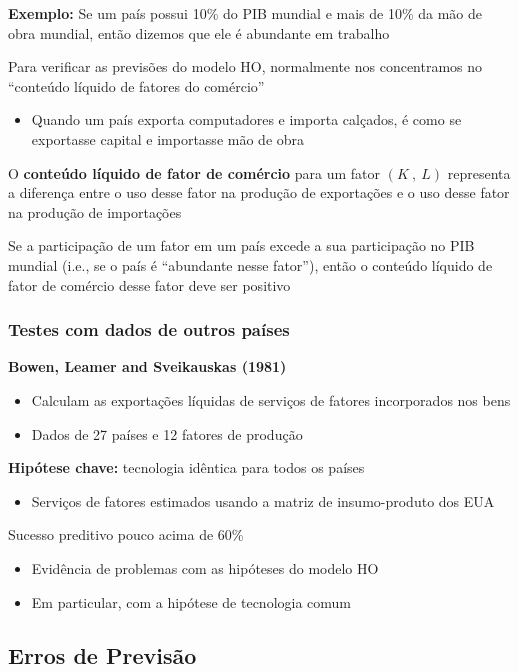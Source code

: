 \documentclass[a4paper,12pt]{article}[abntex2]
\begin{document}
\textbf{Exemplo:} Se um país possui 10\% do PIB mundial e mais de 10\% da mão de obra mundial, então dizemos que ele é abundante em trabalho

Para verificar as previsões do modelo HO, normalmente nos concentramos no “conteúdo líquido de fatores do comércio”\begin{itemize}
    \item Quando um país exporta computadores e importa calçados, é como se exportasse capital e importasse mão de obra
\end{itemize}

O \textbf{conteúdo líquido de fator de comércio} para um fator \((K  \ ,\ L)\)  representa a diferença entre o uso desse fator na produção de exportações e o uso desse fator na produção de importações

Se a participação de um fator em um país excede a sua participação no PIB mundial (i.e., se o país é “abundante nesse fator”), então o conteúdo líquido de fator de comércio desse fator deve ser positivo

\subsubsection{\textbf{Testes com dados de outros países}}

\textbf{Bowen, Leamer and Sveikauskas (1981)} \begin{itemize}
    \item Calculam as exportações líquidas de serviços de fatores incorporados nos bens
    \item Dados de 27 países e 12 fatores de produção
\end{itemize}

\textbf{Hipótese chave:} tecnologia idêntica para todos os países \begin{itemize}
    \item Serviços de fatores estimados usando a matriz de insumo-produto dos EUA
\end{itemize}

Sucesso preditivo pouco acima de 60\%  \begin{itemize}
    \item Evidência de problemas com as hipóteses do modelo HO
    \item Em particular, com a hipótese de tecnologia comum
\end{itemize}

\subsection{\textbf{Erros de Previsão}}
\end{document}
